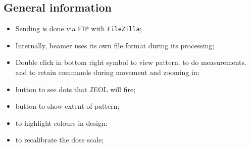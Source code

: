 \subsection{General information}
\begin{itemize}
\item Sending is done via \verb|FTP| with \texttt{FileZilla};
\item Internally, beamer uses its own file format during its processing;
\item Double  click in bottom  right symbol  to view pattern.     to do
  measurements.  and  to  retain commands during movement and zooming
  in;
\item {} button to see dots that JEOL will fire;
\item {} button to show extent of pattern;
\item {} to highlight colours in design;
\item {} to recalibrate the dose scale;
\end{itemize}

